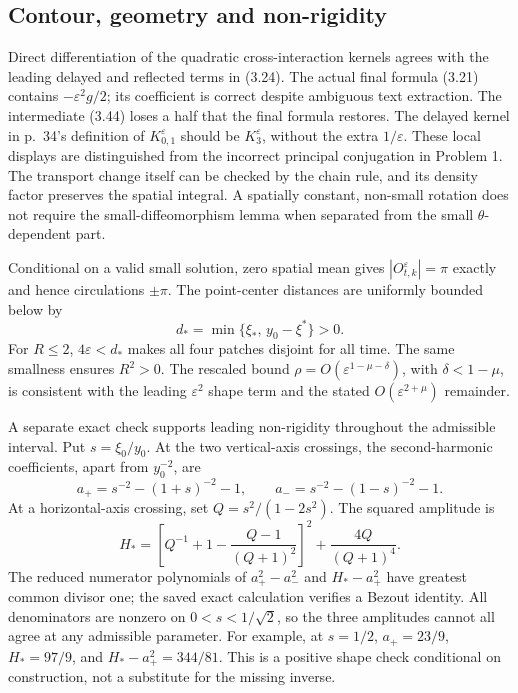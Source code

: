 \documentclass[10pt]{article}
\begin{document}
\subsection*{Contour, geometry and non-rigidity}
Direct differentiation of the quadratic cross-interaction kernels agrees with the leading delayed and reflected terms in (3.24). The actual final formula (3.21) contains \(-\varepsilon^2g/2\); its coefficient is correct despite ambiguous text extraction. The intermediate (3.44) loses a half that the final formula restores. The delayed kernel in p. 34’s definition of \(K_{0,1}^\varepsilon\) should be \(K_3^\varepsilon\), without the extra \(1/\varepsilon\). These local displays are distinguished from the incorrect principal conjugation in Problem 1. The transport change itself can be checked by the chain rule, and its density factor preserves the spatial integral. A spatially constant, non-small rotation does not require the small-diffeomorphism lemma when separated from the small \(\theta\)-dependent part.\par
Conditional on a valid small solution, zero spatial mean gives \(|O_{t,k}^\varepsilon|=\pi\) exactly and hence circulations \(\pm\pi\). The point-center distances are uniformly bounded below by \[d_*=\min\{\xi_*,\,y_0-\xi^*\}>0.\] For \(R\le2\), \(4\varepsilon<d_*\) makes all four patches disjoint for all time. The same smallness ensures \(R^2>0\). The rescaled bound \(\rho=O(\varepsilon^{1-\mu-\delta})\), with \(\delta<1-\mu\), is consistent with the leading \(\varepsilon^2\) shape term and the stated \(O(\varepsilon^{2+\mu})\) remainder.\par
A separate exact check supports leading non-rigidity throughout the admissible interval. Put \(s=\xi_0/y_0\). At the two vertical-axis crossings, the second-harmonic coefficients, apart from \(y_0^{-2}\), are \[a_+=s^{-2}-(1+s)^{-2}-1,\qquad
 a_-=s^{-2}-(1-s)^{-2}-1.\] At a horizontal-axis crossing, set \(Q=s^2/(1-2s^2)\). The squared amplitude is \[H_*=\left[Q^{-1}+1-\frac{Q-1}{(Q+1)^2}\right]^2
                   +\frac{4Q}{(Q+1)^4}.\] The reduced numerator polynomials of \(a_+^2-a_-^2\) and \(H_*-a_+^2\) have greatest common divisor one; the saved exact calculation verifies a Bezout identity. All denominators are nonzero on \(0<s<1/\sqrt2\), so the three amplitudes cannot all agree at any admissible parameter. For example, at \(s=1/2\), \(a_+=23/9\), \(H_*=97/9\), and \(H_*-a_+^2=344/81\). This is a positive shape check conditional on construction, not a substitute for the missing inverse.\par
\end{document}
